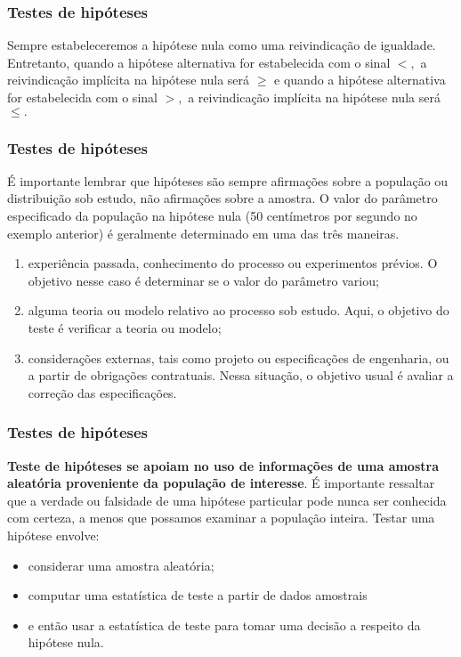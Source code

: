 \documentclass[14pt,aspectratio=1610]{beamer}
\begin{document}
\begin{frame}{}
\frametitle{Testes de hipóteses}

\begin{block}{}
\justifying
Sempre estabeleceremos a hipótese nula como uma reivindicação de igualdade. Entretanto, quando a hipótese alternativa for estabelecida com o sinal $<,$ a reivindicação 
implícita na hipótese nula será $\geq$ e quando a hipótese alternativa for estabelecida com o sinal $>,$ a reivindicação implícita na hipótese nula será $\leq.$
\end{block}
\end{frame}

\begin{frame}{}
\frametitle{Testes de hipóteses}
\begin{block}{}
\justifying
É importante lembrar que hipóteses são sempre afirmações sobre a população ou distribuição sob estudo, não afirmações sobre a amostra. O valor do parâmetro 
especificado da população na hipótese nula (50 centímetros por segundo no exemplo anterior) é geralmente determinado em uma das três maneiras. 
\begin{enumerate}
\item experiência passada, conhecimento do processo ou experimentos prévios. O objetivo nesse caso é determinar se o valor do parâmetro variou;\pause
\item alguma teoria ou modelo relativo ao processo sob estudo. Aqui, o objetivo do teste é verificar a teoria ou modelo;\pause
\item considerações externas, tais como projeto ou especificações de engenharia, ou a partir de obrigações contratuais. Nessa situação, o objetivo usual é avaliar a 
correção das especificações.
\end{enumerate}
 \end{block}
\end{frame}

\begin{frame}{}
\frametitle{Testes de hipóteses}
\begin{block}{}
\justifying
\textbf{Teste de hipóteses se apoiam no uso de informações de uma amostra aleatória proveniente da população de interesse}. É importante ressaltar que a verdade ou 
falsidade de uma hipótese particular pode nunca ser conhecida com certeza, a menos que possamos examinar a população inteira. Testar uma hipótese envolve: 
\begin{itemize}
\item considerar uma amostra aleatória; \pause
\item computar uma estatística de teste a partir de dados amostrais \pause
\item e então usar a estatística de teste para tomar uma decisão a respeito da hipótese nula.
\end{itemize}
\end{block}
\end{frame}
\end{document}
